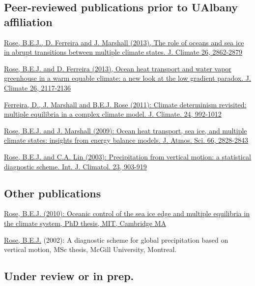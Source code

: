 \documentclass[11pt, letterpaper]{article} %
\newcommand{\years}[1]{\marginnote{\scriptsize #1}} %
\newcommand{\publink}{http://www.atmos.albany.edu/facstaff/brose/resources/Publications/}
\begin{document}
\subsection*{Peer-reviewed publications prior to UAlbany affiliation} 
 
\years{2013}  
\href{\publink Rose_etal_transitions_JClim2013.pdf}{\underline{Rose, B.E.J.}, D. Ferreira and J. Marshall (2013), The role of oceans and sea ice in abrupt transitions between multiple climate states. J. Climate 26, 2862-2879}
\vspace{0.2 cm}

\href{\publink Rose_Ferreira_JClim2013.pdf}{\underline{Rose, B.E.J.} and D. Ferreira (2013), Ocean heat transport and water vapor greenhouse in a warm equable climate: a new look at the low gradient paradox. J. Climate 26, 2117-2136}
\vspace{0.2 cm}

\years{2011}  
\href{\publink FMR_JClim2011_MultipleEq.pdf}{Ferreira, D., J. Marshall and \underline{B.E.J. Rose} (2011): Climate determinism revisited: multiple equilibria in a complex climate model. J. Climate. 24, 992-1012}
\vspace{0.2 cm}
  
\years{2009}  
\href{\publink Rose_Marshall_JAS2009.pdf}{\underline{Rose, B.E.J.} and J. Marshall (2009): Ocean heat transport, sea ice, and multiple climate states: insights from energy balance models. J. Atmos. Sci. 66, 2828-2843}
\vspace{0.2 cm}
  
\years{2003}  
\href{\publink Rose_Lin_2003.pdf}{\underline{Rose, B.E.J.} and C.A. Lin (2003): Precipitation from vertical motion: a statistical diagnostic scheme. Int. J. Climatol. 23, 903-919}


\subsection*{Other publications}
\years{2010}  
\href{\publink Rose_PhD_2010.pdf}{\underline{Rose, B.E.J.} (2010): Oceanic control of the sea ice edge and multiple equilibria in the climate system, PhD thesis, MIT, Cambridge MA}
\vspace{0.2 cm}

\years{2002}  
\underline{Rose, B.E.J.} (2002): A diagnostic scheme for global precipitation based on vertical motion, MSc thesis, McGill University, Montreal.


\subsection*{Under review or in prep.}\label{work-in-progress}
\end{document}
